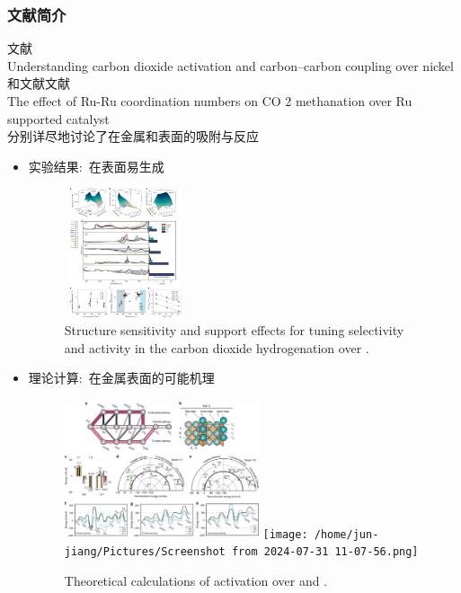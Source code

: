 \small
\begin{frame}[allowframebreaks]
	\frametitle{文献简介}
	文献\cite{NatCom10-1_2019}\\\textrm{Understanding carbon dioxide activation and carbon–carbon coupling over nickel}%
	和文献文献\cite{ASS603-154398_2022}\\
	\textrm{The effect of Ru-Ru coordination numbers on CO 2 methanation over Ru supported catalyst}
	\\分别详尽地讨论了\textrm{}在金属\textrm{}和\textrm{}表面的吸附与反应
	\begin{itemize}
	 \setlength{\itemsep}{-10pt}
		\item 实验结果:~\textrm{}在\textrm{}表面易生成\textrm{}
\begin{figure}[h!]
\centering
\includegraphics[height=1.50in,width=1.42in]{Figures/CO2_on_Ni-0.png}
\caption{\tiny \textrm{Structure sensitivity and support effects for tuning selectivity and activity in the carbon dioxide hydrogenation over .}}%
\label{CO2_0n_Ni-0}
\end{figure}
		\item 理论计算:~\textrm{}在金属表面的可能机理
\begin{figure}[h!]
\centering
\includegraphics[height=1.60in,width=2.25in]{Figures/CO2_on_Ni-1.png}
\texttt{[image: /home/jun-jiang/Pictures/Screenshot from 2024-07-31 11-07-56.png]}
\caption{\tiny \textrm{Theoretical calculations of  activation over  and .}}%
\label{CO2_0n_Ni-1}
\end{figure}
	\end{itemize}
\end{frame}

